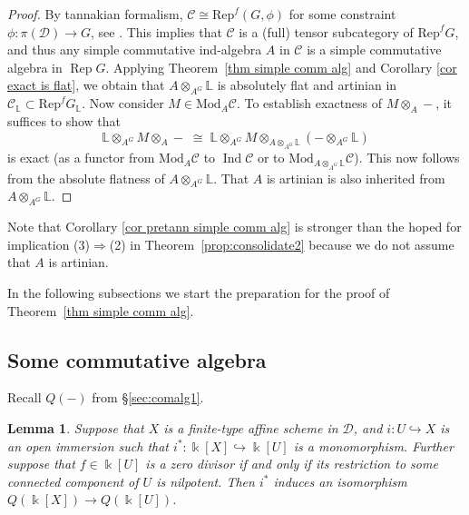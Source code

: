 \documentclass[11pt]{amsart}
\def\Ind{\operatorname{Ind}}
\def\Cs{\mathscr{C}}
\def\Ds{\mathscr{D}}
\def\Rep{\operatorname{Rep}}
\def\Mod{\mathrm{Mod}}
\newcommand{\mL}{\mathbb{L}}
\newtheorem{lemma}[thm]{Lemma}
\theoremstyle{definition}
\theoremstyle{remark}
\numberwithin{equation}{section}
\begin{document}
\begin{proof}
    By tannakian formalism, $\Cs\cong\mathrm{Rep}^f(G,\phi)$ for some constraint $\phi:\pi(\Ds)\to G$, see \cite[\S 8]{Del90}.  This implies that $\Cs$ is a (full) tensor subcategory of $\mathrm{Rep}^f G$, and thus any simple commutative ind-algebra $A$ in $\Cs$ is a simple commutative algebra in $\Rep G$.  Applying Theorem~\ref{thm simple comm alg} and Corollary \ref{cor exact is flat}, we obtain that $A\otimes_{A^G}\mathbb{L}$ is absolutely flat and artinian in $\Cs_{\mL}\subset \mathrm{Rep}^f G_{\mL}$. Now consider $M\in \Mod_A\Cs $. To establish exactness of $M\otimes_A-$, it suffices to show that
    $$\mL\otimes_{A^G} M\otimes_A-\;\cong\; \mL\otimes_{A^G} M\otimes_{A\otimes_{A^G}\mL}(-\otimes_{A^G}\mL)$$
    is exact (as a functor from $\Mod_A{\Cs}$ to $\Ind\Cs$ or to $\Mod_{A\otimes_{A^G}\mL}\Cs$). This now follows from the absolute flatness of $A\otimes_{A^G}\mL$. That $A$ is artinian is also inherited from $A\otimes_{A^G}\mL$.
\end{proof}

Note that Corollary \ref{cor pretann simple comm alg} is stronger than the hoped for implication (3)$\Rightarrow$(2) in Theorem~\ref{prop:consolidate2} because we do not assume that $A$ is artinian. 


In the following subsections we start the preparation for the proof of Theorem~\ref{thm simple comm alg}.

\subsection{Some commutative algebra}



Recall $Q(-)$ from \S\ref{sec:comalg1}.
\begin{lemma}\label{lemma open iso field frac}
    Suppose that $X$ is a finite-type affine scheme in $\Ds$, and $i:U\hookrightarrow X$ is an open immersion such that $i^*:\Bbbk[X]\hookrightarrow\Bbbk[U]$ is a monomorphism.  Further suppose that $f\in\Bbbk[U]$ is a zero divisor if and only if its restriction to some connected component of $U$ is nilpotent. Then $i^*$ induces an isomorphism $Q(\Bbbk[X])\to Q(\Bbbk[U])$.
\end{lemma}
\end{document}
